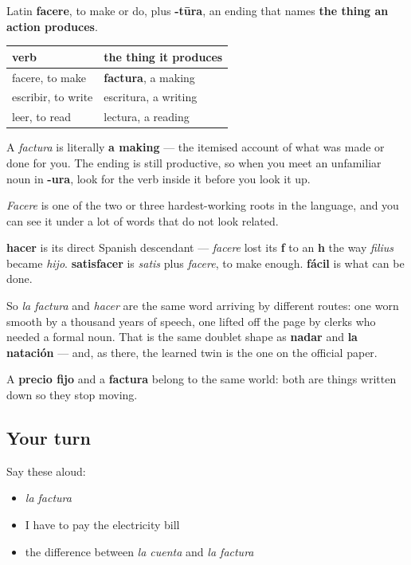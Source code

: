 \begin{cousinweb}
Latin \textbf{facere}, to make or do, plus \textbf{-tūra}, an ending that names \textbf{the thing an action produces}.

\noindent
\begin{tabularx}{\linewidth}{@{}>{\raggedright\arraybackslash}X>{\raggedright\arraybackslash}X@{}}
\toprule
\textbf{verb} & \textbf{the thing it produces} \\
\midrule
facere, to make & \textbf{factura}, a making \\
escribir, to write & escritura, a writing \\
leer, to read & lectura, a reading \\
\bottomrule
\end{tabularx}

A \emph{factura} is literally \textbf{a making} — the itemised account of what was made or done for you. The ending is still productive, so when you meet an unfamiliar noun in \textbf{-ura}, look for the verb inside it before you look it up.
\end{cousinweb}

\begin{culture}
\emph{Facere} is one of the two or three hardest-working roots in the language, and you can see it under a lot of words that do not look related.

\textbf{hacer} is its direct Spanish descendant — \emph{facere} lost its \textbf{f} to an \textbf{h} the way \emph{filius} became \emph{hijo}. \textbf{satisfacer} is \emph{satis} plus \emph{facere}, to make enough. \textbf{fácil} is what can be done.

So \emph{la factura} and \emph{hacer} are the same word arriving by different routes: one worn smooth by a thousand years of speech, one lifted off the page by clerks who needed a formal noun. That is the same doublet shape as \textbf{nadar} and \textbf{la natación} — and, as there, the learned twin is the one on the official paper.

A \textbf{precio fijo} and a \textbf{factura} belong to the same world: both are things written down so they stop moving.
\end{culture}

\subsection*{Your turn}
Say these aloud:

\begin{itemize}
\raggedright
  \item \emph{la factura}
  \item I have to pay the electricity bill
  \item the difference between \emph{la cuenta} and \emph{la factura}
\end{itemize}

